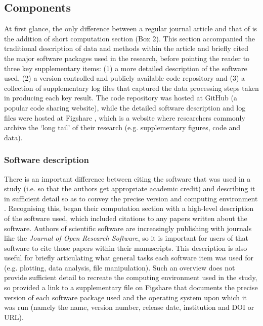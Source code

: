 \subsection{Components}

At first glance, the only difference between a regular journal article and that of \citet{Irving2016} is the addition of short computation section (Box 2). This section accompanied the traditional description of data and methods within the article and briefly cited the major software packages used in the research, before pointing the reader to three key supplementary items: (1) a more detailed description of the software used, (2) a version controlled and publicly available code repository and (3) a collection of supplementary log files that captured the data processing steps taken in producing each key result. The code repository was hosted at GitHub (a popular code sharing website), while the detailed software description and log files were hosted at Figshare \citep{Irving2015}, which is a website where researchers commonly archive the `long tail' of their research (e.g. supplementary figures, code and data). 

\subsubsection{Software description}

There is an important difference between citing the software that was used in a study (i.e. so that the authors get appropriate academic credit) and describing it in sufficient detail so as to convey the precise version and computing environment \citep{Jackson2012}. Recognising this, \citet{Irving2016} began their computation section with a high-level description of the software used, which included citations to any papers written about the software. Authors of scientific software are increasingly publishing with journals like the \textit{Journal of Open Research Software}, so it is important for users of that software to cite those papers within their manuscripts. This description is also useful for briefly articulating what general tasks each software item was used for (e.g. plotting, data analysis, file manipulation). Such an overview does not provide sufficient detail to recreate the computing environment used in the study, so \citet{Irving2016} provided a link to a supplementary file on Figshare that documents the precise version of each software package used and the operating system upon which it was run (namely the name, version number, release date, institution and DOI or URL). 

